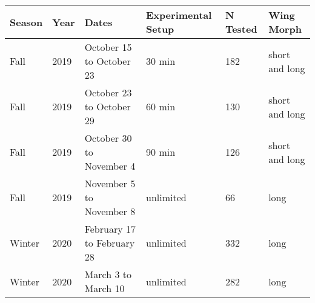 
\begin{tabular}{l|l|l|l|l|l}
\hline
Season & Year & Dates & Experimental Setup & N Tested & Wing Morph\\
\hline
Fall & 2019 & October 15 to October 23 & 30 min & 182 & short and long\\
\hline
Fall & 2019 & October 23 to October 29 & 60 min & 130 & short and long\\
\hline
Fall & 2019 & October 30 to November 4 & 90 min & 126 & short and long\\
\hline
Fall & 2019 & November 5 to November 8 & unlimited & 66 & long\\
\hline
Winter & 2020 & February 17 to February 28 & unlimited & 332 & long\\
\hline
Winter & 2020 & March 3 to March 10 & unlimited & 282 & long\\
\hline
\end{tabular}
